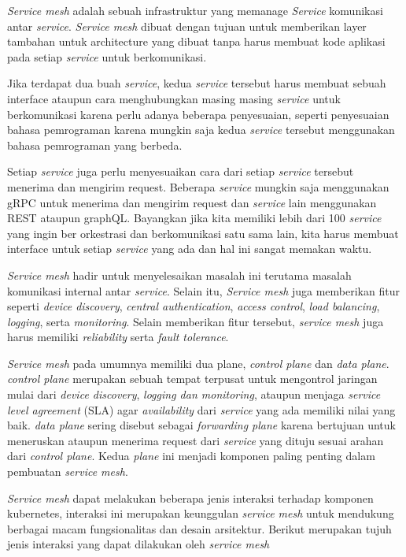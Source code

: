 \textit{Service mesh} adalah sebuah infrastruktur yang memanage \textit{Service} komunikasi antar \textit{service}. \textit{Service mesh} dibuat dengan tujuan untuk memberikan layer tambahan untuk architecture yang dibuat tanpa harus membuat kode aplikasi pada setiap \textit{service} untuk berkomunikasi.\parencite{li2019}

Jika terdapat dua buah \textit{service}, kedua \textit{service} tersebut harus membuat sebuah interface ataupun cara menghubungkan masing masing \textit{service} untuk berkomunikasi karena perlu adanya beberapa penyesuaian, seperti penyesuaian bahasa pemrograman karena mungkin saja kedua \textit{service} tersebut menggunakan bahasa pemrograman yang berbeda.

Setiap \textit{service} juga perlu menyesuaikan cara dari setiap \textit{service} tersebut menerima dan mengirim request. Beberapa \textit{service} mungkin saja menggunakan gRPC untuk menerima dan mengirim request dan \textit{service} lain menggunakan REST ataupun graphQL. Bayangkan jika kita memiliki lebih dari 100 \textit{service} yang ingin ber orkestrasi dan berkomunikasi satu sama lain, kita harus membuat interface untuk setiap \textit{service} yang ada dan hal ini sangat memakan waktu.

\textit{Service mesh} hadir untuk menyelesaikan masalah ini terutama masalah komunikasi internal antar \textit{service}. Selain itu, \textit{Service mesh} juga memberikan fitur seperti \textit{device discovery}, \textit{central authentication}, \textit{access control}, \textit{load balancing}, \textit{logging}, serta \textit{monitoring}. Selain memberikan fitur tersebut, \textit{\textit{service} mesh} juga harus memiliki \textit{reliability} serta \textit{fault tolerance}. \parencite{li2019}

\textit{Service mesh} pada umumnya memiliki dua plane, \textit{control plane} dan \textit{data plane}. \textit{control plane} merupakan sebuah tempat terpusat untuk mengontrol jaringan mulai dari \textit{device discovery}, \textit{logging dan monitoring}, ataupun menjaga \textit{service level agreement} (SLA) agar \textit{availability} dari \textit{service} yang ada memiliki nilai yang baik. \textit{data plane} sering disebut sebagai \textit{forwarding plane} karena bertujuan untuk meneruskan ataupun menerima request dari \textit{service} yang dituju sesuai arahan dari \textit{control plane}. Kedua \textit{plane} ini menjadi komponen paling penting dalam pembuatan \textit{\textit{service} mesh}.

\textit{Service mesh} dapat melakukan beberapa jenis interaksi terhadap komponen kubernetes, interaksi ini merupakan keunggulan \textit{service mesh} untuk mendukung berbagai macam fungsionalitas dan desain arsitektur. Berikut merupakan tujuh jenis interaksi yang dapat dilakukan oleh \textit{service mesh} \parencite{ganguli2021}

